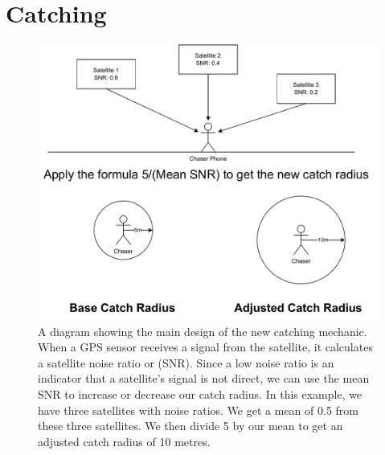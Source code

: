 \documentclass{l4proj}
\begin{document}
\section{Catching}
\begin{figure}
    \centering
    \includegraphics[width=1.00\linewidth]{images/snr_adjustment.pdf}
    \caption{A diagram showing the main design of the new catching mechanic. When a GPS sensor receives a signal from the satellite,
    it calculates a satellite noise ratio or (SNR). Since a low noise ratio is an indicator that a satellite's signal is not direct, 
    we can use the mean SNR to increase or decrease our catch radius. In this example, we have three satellites with noise ratios.
    We get a mean of 0.5 from these three satellites. We then divide 5 by our mean to get an adjusted catch radius of 10 metres. }
    \label{fig:snrcatching}
\end{figure}
\end{document}
